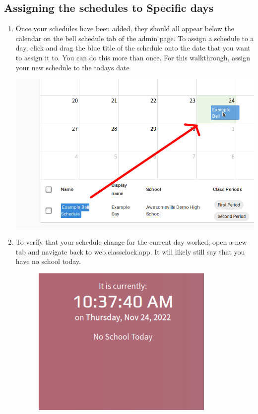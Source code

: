 \documentclass{article}
\begin{document}
\subsection{Assigning the schedules to Specific days}
\begin{enumerate}
\item {Once your schedules have been added, they should all appear below the calendar on the bell schedule tab of the admin page. To assign a schedule to a day, click and drag the blue
title of the schedule onto the date that you want to assign it to. You can do this more than once. For this
walkthrough, assign your new schedule to the todays date\newline
}
\begin{center}
\includegraphics[width=\textwidth]{images/dragging-schedule-arrow.png}
\end{center}
\item {To verify that your schedule change for the current day worked, open a new tab and navigate back to web.classclock.app.
It will likely still say that you have no school today.}
\begin{center}
\includegraphics[width=4.4366in,height=2.8764in]{images/no-school-day.png}

\end{center}
\end{enumerate}
\end{document}
